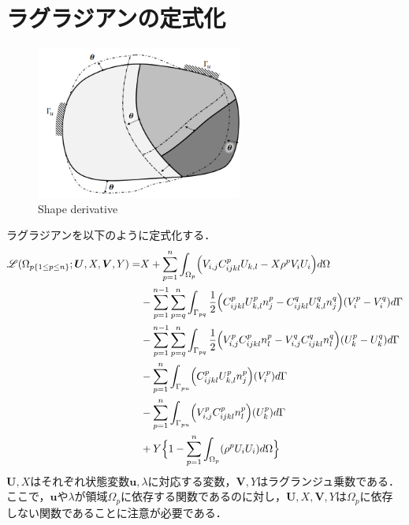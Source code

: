 \section{ラグラジアンの定式化}

\begin{figure}[ht]
	\begin{center}
		\includegraphics[height=5cm]{./figures/SD.png}
		\caption{Shape derivative}
		\label{fig:SD}
	\end{center}
\end{figure}

ラグラジアンを以下のように定式化する．
\begin{align}
	\mathscr{L}(\Omega_{p\{1\leq p\leq n\}};\bm{U},X,\bm{V},Y)=
	&X+\sum_{p=1}^{n}\int_{\Omega_p}\Bigr( V_{i,j}C_{ijkl}^{p}U_{k,l}-X\rho^{p}V_{i}U_{i}\Bigl) d\Omega
	\nonumber
	\\
	&-\sum_{p=1}^{n-1}\sum_{p=q}^{n}\int_{\Gamma_{pq}}\frac{1}{2}\Bigr(C_{ijkl}^{p}U_{k,l}^{p}n_{j}^{p}-C_{ijkl}^{q}U_{k,l}^{q}n_{j}^{q}\Bigl)(V_{i}^{p}-V_{i}^{q}) d\Gamma
	\nonumber
	\\
	&-\sum_{p=1}^{n-1}\sum_{p=q}^{n}\int_{\Gamma_{pq}}\frac{1}{2}\Bigr(V_{i,j}^{p}C_{ijkl}^{p}n_{l}^{p}-V_{i,j}^{q}C_{ijkl}^{q}n_{l}^{q}\Bigl)(U_{k}^{p}-U_{k}^{q})d\Gamma
	\nonumber
	\\
	&-\sum_{p=1}^{n}\int_{\Gamma_{pu}}\Bigr(C_{ijkl}^{p}U_{k,l}^{p}n_{j}^{p}\Bigl)(V_{i}^{p}) d\Gamma
	\nonumber
	\\
	&-\sum_{p=1}^{n}\int_{\Gamma_{pu}}\Bigr(V_{i,j}^{p}C_{ijkl}^{p}n_{l}^{p}\Bigl)(U_{k}^{p}) d\Gamma
	\nonumber
	\\
	&+Y\Bigr\{1- \sum_{p=1}^{n}\int_{\Omega_{p}}(\rho^{p}U_{i}U_{i}) d\Omega \Bigl\}
	\label{eq:lagrange}
\end{align}
$\bm{U},X$はそれぞれ状態変数$\bm{u},\lambda$に対応する変数，$\bm{V},Y$はラグランジュ乗数である．
ここで，$\bm{u}$や$\lambda$が領域$\Omega_p$に依存する関数であるのに対し，$\bm{U},X,\bm{V},Y$は$\Omega_p$に依存しない関数であることに注意が必要である．

